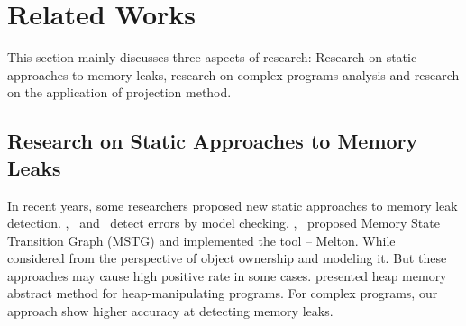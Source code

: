 \section{Related Works}\label{sec:related}
This section mainly discusses three aspects of research: Research on static approaches to memory leaks, research on complex programs analysis and research on the application of projection method.
\subsection{Research on Static Approaches to Memory Leaks}

In recent years, some researchers proposed new static approaches to memory leak detection. \cite{XZX11},~\cite{XZX15} and~\cite{HL06} detect errors by model checking. \cite{XZX11},~\cite{XZX15} proposed Memory State Transition Graph (MSTG) and implemented the tool -- Melton. While ~\cite{HL06} considered from the perspective of object ownership and modeling it. But these approaches may cause high positive rate in some cases. \cite{DWC12} presented heap memory abstract method for heap-manipulating programs. For complex programs, our approach show higher accuracy at detecting memory leaks.   

